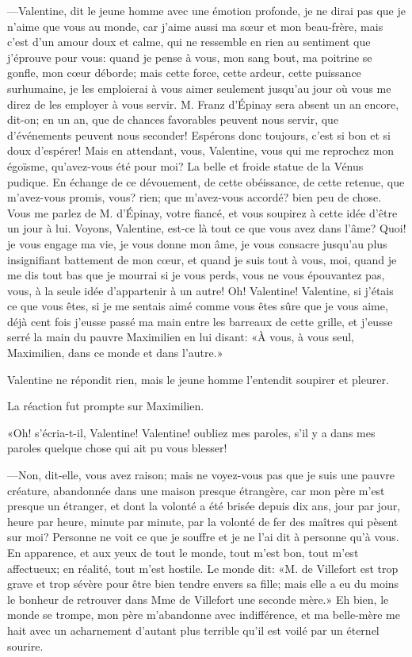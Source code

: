 —Valentine, dit le jeune homme avec une émotion profonde, je ne dirai pas que je n'aime que vous au monde, car j'aime aussi ma sœur et mon beau-frère, mais c'est d'un amour doux et calme, qui ne ressemble en rien au sentiment que j'éprouve pour vous: quand je pense à vous, mon sang bout, ma poitrine se gonfle, mon cœur déborde; mais cette force, cette ardeur, cette puissance surhumaine, je les emploierai à vous aimer seulement jusqu'au jour où vous me direz de les employer à vous servir. M. Franz d'Épinay sera absent un an encore, dit-on; en un an, que de chances favorables peuvent nous servir, que d'événements peuvent nous seconder! Espérons donc toujours, c'est si bon et si doux d'espérer! Mais en attendant, vous, Valentine, vous qui me reprochez mon égoïsme, qu'avez-vous été pour moi? La belle et froide statue de la Vénus pudique. En échange de ce dévouement, de cette obéissance, de cette retenue, que m'avez-vous promis, vous? rien; que m'avez-vous accordé? bien peu de chose. Vous me parlez de M. d'Épinay, votre fiancé, et vous soupirez à cette idée d'être un jour à lui. Voyons, Valentine, est-ce là tout ce que vous avez dans l'âme? Quoi! je vous engage ma vie, je vous donne mon âme, je vous consacre jusqu'au plus insignifiant battement de mon cœur, et quand je suis tout à vous, moi, quand je me dis tout bas que je mourrai si je vous perds, vous ne vous épouvantez pas, vous, à la seule idée d'appartenir à un autre! Oh! Valentine! Valentine, si j'étais ce que vous êtes, si je me sentais aimé comme vous êtes sûre que je vous aime, déjà cent fois j'eusse passé ma main entre les barreaux de cette grille, et j'eusse serré la main du pauvre Maximilien en lui disant: «À vous, à vous seul, Maximilien, dans ce monde et dans l'autre.» 

Valentine ne répondit rien, mais le jeune homme l'entendit soupirer et pleurer. 

La réaction fut prompte sur Maximilien. 

«Oh! s'écria-t-il, Valentine! Valentine! oubliez mes paroles, s'il y a dans mes paroles quelque chose qui ait pu vous blesser! 

—Non, dit-elle, vous avez raison; mais ne voyez-vous pas que je suis une pauvre créature, abandonnée dans une maison presque étrangère, car mon père m'est presque un étranger, et dont la volonté a été brisée depuis dix ans, jour par jour, heure par heure, minute par minute, par la volonté de fer des maîtres qui pèsent sur moi? Personne ne voit ce que je souffre et je ne l'ai dit à personne qu'à vous. En apparence, et aux yeux de tout le monde, tout m'est bon, tout m'est affectueux; en réalité, tout m'est hostile. Le monde dit: «M. de Villefort est trop grave et trop sévère pour être bien tendre envers sa fille; mais elle a eu du moins le bonheur de retrouver dans Mme de Villefort une seconde mère.» Eh bien, le monde se trompe, mon père m'abandonne avec indifférence, et ma belle-mère me hait avec un acharnement d'autant plus terrible qu'il est voilé par un éternel sourire. 

